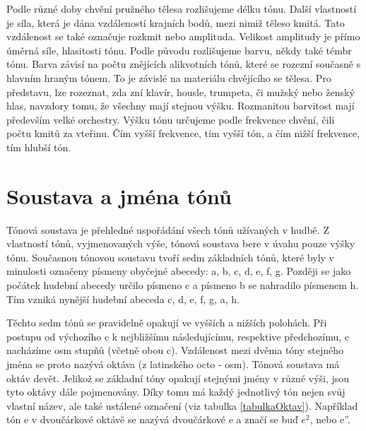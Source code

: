 Podle různé doby chvění pružného tělesa rozlišujeme délku tónu. 
Další vlastností je síla, která je dána vzdáleností krajních bodů,
mezi nimiž těleso kmitá.
Tato vzdálenost se také označuje rozkmit nebo amplituda.
Velikost amplitudy je přímo úměrná síle, hlasitosti tónu.
Podle původu rozlišujeme barvu, někdy také témbr tónu.
Barva závisí na počtu znějících alikvotních tónů,
které se rozezní současně s hlavním hraným tónem. 
To je závislé na materiálu chvějícího se tělesa.
Pro představu, lze rozeznat, zda zní klavír, housle, trumpeta, či mužský nebo ženský hlas, 
navzdory tomu, že všechny mají stejnou výšku. 
Rozmanitou barvitost mají především velké orchestry.
Výšku tónu určujeme podle frekvence chvění, čili počtu kmitů za vteřinu. 
Čím vyšší frekvence, tím vyšší tón, a čím nižší frekvence, tím hlubší tón.\cite{zenkl,cmiral} \par

\section{Soustava a jména tónů}
Tónová soustava je přehledné uspořádání všech tónů užívaných v hudbě.
Z vlastností tónů, vyjmenovaných výše, tónová soustava bere v úvahu pouze výšky tónu. 
Současnou tónovou soustavu tvoří sedm základních tónů, které
byly v minulosti označeny písmeny obyčejné abecedy: a, b, c, d, e, f, g.
Později se jako počátek hudební abecedy určilo písmeno c 
a písmeno b se nahradilo písmenem h.
Tím vzniká nynější hudební abeceda c, d, e, f, g, a, h.\par
Těchto sedm tónů se pravidelně opakují ve vyšších a nižších polohách.
Při postupu od výchozího c k nejbližšímu následujícímu, respektive předchozímu, c nacházíme osm stupňů 
(včetně obou c).
Vzdálenost mezi dvěma tóny stejného jména se proto nazývá oktáva (z latinského octo - osm).
Tónová soustava má oktáv devět.
Jelikož se základní tóny opakují stejnými jmény v různé výši,
jsou tyto oktávy dále pojmenovány.
Díky tomu má každý jednotlivý tón nejen svůj vlastní název,
ale také ustálené označení (viz tabulka \ref{tabulkaOktav}).
Například tón e v dvoučárkové oktávě se nazývá dvoučárkové e
a značí se buď $e^2$, nebo{ e''}.\cite{zenkl,cmiral}\par

